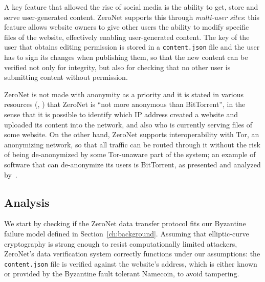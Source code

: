 \documentclass[mscthesis]{usiinfthesis}
\begin{document}
A key feature that allowed the rise of social media is the ability to get, store and serve user-generated content. ZeroNet supports this through \emph{multi-user sites}: this feature allows website owners to give other users the ability to modify specific files of the website, effectively enabling user-generated content. The key of the user that obtains editing permission is stored in a \texttt{content.json} file and the user has to sign its changes when publishing them, so that the new content can be verified not only for integrity, but also for checking that no other user is submitting content without permission.

ZeroNet is not made with anonymity as a priority and it is stated in various resources (\cite{website:zeronetpresentation}, \cite{website:zeronetfaq}) that ZeroNet is ``not more anonymous than BitTorrent'', in the sense that it is possible to identify which IP address created a website and uploaded its content into the network, and also who is currently serving files of some website. On the other hand, ZeroNet supports interoperability with Tor, an anonymizing network, so that all traffic can be routed through it without the risk of being de-anonymized by some Tor-unaware part of the system; an example of software that can de-anonymize its users is BitTorrent, as presented and analyzed by~\cite{manils2010compromising}.

\subsection{Analysis}

We start by checking if the ZeroNet data transfer protocol fits our Byzantine failure model defined in Section~\ref{ch:background}. Assuming that elliptic-curve cryptography is strong enough to resist computationally limited attackers, ZeroNet's data verification system correctly functions under our assumptions: the \texttt{content.json} file is verified against the website's address, which is either known or provided by the Byzantine fault tolerant Namecoin, to avoid tampering.
\end{document}
